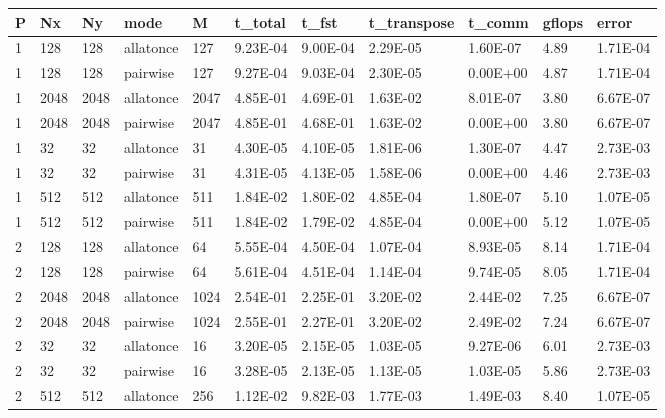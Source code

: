 \documentclass[11pt]{article}
\begin{document}
\begin{table}
  \centering
  \begin{adjustbox}{max width=\textwidth, max totalheight=0.95\textheight}
    \begin{tabular}{lllllllllll}
      \toprule
      P   & Nx   & Ny   & mode      & M    & t\_total & t\_fst   & t\_transpose & t\_comm  & gflops & error    \\
      \midrule
      1   & 128  & 128  & allatonce & 127  & 9.23E-04 & 9.00E-04 & 2.29E-05     & 1.60E-07 & 4.89   & 1.71E-04 \\
      1   & 128  & 128  & pairwise  & 127  & 9.27E-04 & 9.03E-04 & 2.30E-05     & 0.00E+00 & 4.87   & 1.71E-04 \\
      1   & 2048 & 2048 & allatonce & 2047 & 4.85E-01 & 4.69E-01 & 1.63E-02     & 8.01E-07 & 3.80   & 6.67E-07 \\
      1   & 2048 & 2048 & pairwise  & 2047 & 4.85E-01 & 4.68E-01 & 1.63E-02     & 0.00E+00 & 3.80   & 6.67E-07 \\
      1   & 32   & 32   & allatonce & 31   & 4.30E-05 & 4.10E-05 & 1.81E-06     & 1.30E-07 & 4.47   & 2.73E-03 \\
      1   & 32   & 32   & pairwise  & 31   & 4.31E-05 & 4.13E-05 & 1.58E-06     & 0.00E+00 & 4.46   & 2.73E-03 \\
      1   & 512  & 512  & allatonce & 511  & 1.84E-02 & 1.80E-02 & 4.85E-04     & 1.80E-07 & 5.10   & 1.07E-05 \\
      1   & 512  & 512  & pairwise  & 511  & 1.84E-02 & 1.79E-02 & 4.85E-04     & 0.00E+00 & 5.12   & 1.07E-05 \\
      2   & 128  & 128  & allatonce & 64   & 5.55E-04 & 4.50E-04 & 1.07E-04     & 8.93E-05 & 8.14   & 1.71E-04 \\
      2   & 128  & 128  & pairwise  & 64   & 5.61E-04 & 4.51E-04 & 1.14E-04     & 9.74E-05 & 8.05   & 1.71E-04 \\
      2   & 2048 & 2048 & allatonce & 1024 & 2.54E-01 & 2.25E-01 & 3.20E-02     & 2.44E-02 & 7.25   & 6.67E-07 \\
      2   & 2048 & 2048 & pairwise  & 1024 & 2.55E-01 & 2.27E-01 & 3.20E-02     & 2.49E-02 & 7.24   & 6.67E-07 \\
      2   & 32   & 32   & allatonce & 16   & 3.20E-05 & 2.15E-05 & 1.03E-05     & 9.27E-06 & 6.01   & 2.73E-03 \\
      2   & 32   & 32   & pairwise  & 16   & 3.28E-05 & 2.13E-05 & 1.13E-05     & 1.03E-05 & 5.86   & 2.73E-03 \\
      2   & 512  & 512  & allatonce & 256  & 1.12E-02 & 9.82E-03 & 1.77E-03     & 1.49E-03 & 8.40   & 1.07E-05 \\

\end{tabular}
\end{adjustbox}
\end{table}
\end{document}
